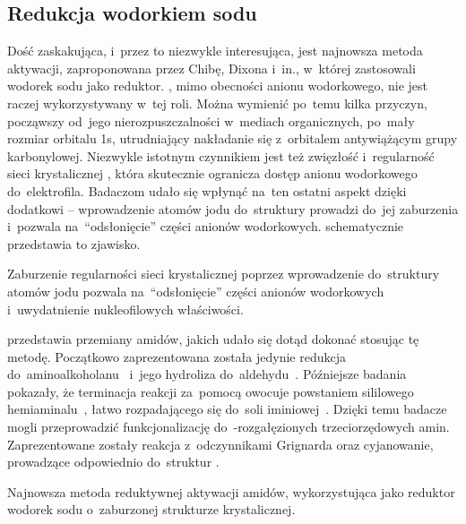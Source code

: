\subsection{Redukcja wodorkiem sodu}\label{literature:new:sodium-hydride}
Dość zaskakująca, i~przez to niezwykle interesująca, jest najnowsza metoda aktywacji,
  zaproponowana przez Chibę, Dixona i~in., w~której zastosowali wodorek sodu jako reduktor.
, mimo obecności anionu wodorkowego, nie jest raczej wykorzystywany w~tej roli.
Można wymienić po~temu kilka przyczyn, począwszy od~jego nierozpuszczalności w~mediach
  organicznych, po~mały rozmiar orbitalu 1s, utrudniający nakładanie się z~orbitalem
  antywiążącym grupy karbonylowej.
Niezwykle istotnym czynnikiem jest też zwięzłość i~regularność sieci krystalicznej ,
  która skutecznie ogranicza dostęp anionu wodorkowego do~elektrofila.
Badaczom udało się wpłynąć na~ten ostatni aspekt dzięki dodatkowi  \--- wprowadzenie
  atomów jodu do~struktury prowadzi do~jej zaburzenia i~pozwala na~\enquote{odsłonięcie}
  części anionów wodorkowych.
 schematycznie przedstawia to zjawisko.
\begin{marginfigure}[-13\baselineskip]
  
  \caption{
    Zaburzenie regularności sieci krystalicznej  poprzez wprowadzenie do~struktury
      atomów jodu pozwala na~\enquote{odsłonięcie} części anionów wodorkowych
      i~uwydatnienie nukleofilowych właściwości.
  }
  \label{fig:nah-nai-crystal}
\end{marginfigure}

 przedstawia przemiany amidów, jakich udało się dotąd dokonać
  stosując tę metodę.
Początkowo zaprezentowana została jedynie redukcja do~aminoalkoholanu~
  i~jego hydroliza do~aldehydu~.
Późniejsze badania pokazały, że terminacja reakcji za~pomocą  owocuje powstaniem
  sililowego hemiaminalu~, łatwo rozpadającego się do~soli
  iminiowej~.
Dzięki temu badacze mogli przeprowadzić funkcjonalizację do~\textalpha{}-rozgałęzionych
  trzeciorzędowych amin.
Zaprezentowane zostały reakcja z~odczynnikami Grignarda oraz cyjanowanie, prowadzące odpowiednio
  do~struktur .
\begin{scheme*}
  
  \caption{
    Najnowsza metoda reduktywnej aktywacji amidów, wykorzystująca jako reduktor wodorek sodu
      o~zaburzonej strukturze krystalicznej.
  }
  \label{sch:nah-nai-activation}
\end{scheme*}

